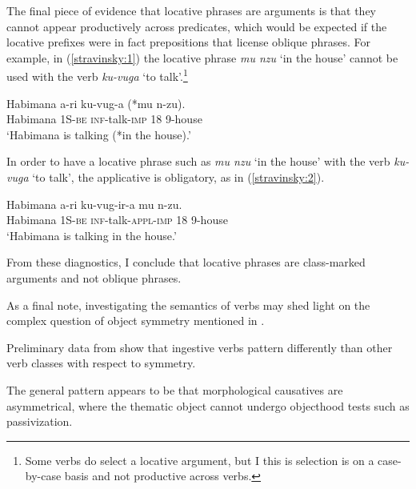 \documentclass[output=paper]{langsci/langscibook}
\begin{document}
 The final piece of evidence that locative phrases are arguments is that they cannot appear productively across predicates, which would be expected if the locative prefixes were in fact prepositions that license oblique phrases. For example, in (\ref{stravinsky:1}) the locative phrase \emph{mu nzu} `in the house' cannot be used with the verb \emph{ku-vuga} `to talk'.\footnote{Some verbs do select a locative argument, but I this is selection is on a case-by-case basis and not productive across verbs.}
 \begin{exe}
\ex\label{stravinsky:1}\gll Habimana a-ri ku-vug-a (*mu n-zu).\\
			Habimana 1S-{\scshape be} {\scshape inf}-talk-{\scshape imp} \phantom{(*}18 9-house\\%
				\glt `Habimana is talking (*in the house).'
\end{exe}
In order to have a locative phrase such as \emph{mu nzu} `in the house' with the verb \emph{ku-vuga} `to talk', the applicative is obligatory, as in (\ref{stravinsky:2}).
\begin{exe}
\ex\label{stravinsky:2}\gll Habimana a-ri ku-vug-ir-a mu n-zu.\\
			Habimana 1S-{\scshape be} {\scshape inf}-talk-{\scshape appl-imp} 18 9-house\\
				\glt `Habimana is talking in the house.'
\end{exe}
 From these diagnostics, I conclude that  locative phrases are class-marked arguments and not oblique phrases. 
 
\iffalse 
  As a final note, investigating the semantics of verbs may shed light on the complex question of  object symmetry mentioned in . 
 
  Preliminary data from  show that ingestive verbs pattern differently than other verb classes with respect to symmetry. 
 
  The general pattern appears to be that morphological causatives are asymmetrical, where the thematic object cannot undergo objecthood tests such as passivization.
 
\end{document}
